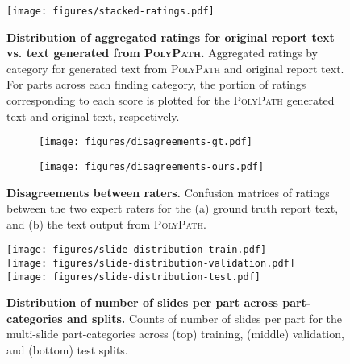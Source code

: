 \documentclass[11pt]{article}
\newcommand{\ourmodel}{\textsc{PolyPath}\xspace}
\begin{document}
\begin{figure}
    \centering
    \texttt{[image: figures/stacked-ratings.pdf]}
    \caption{\small \textbf{Distribution of aggregated ratings for original report text vs. text generated from \ourmodel.} Aggregated ratings by category for generated text from \ourmodel and original report text. For parts across each finding category, the portion of ratings corresponding to each score is plotted for the \ourmodel generated text and original text, respectively.}
    \label{fig:stackedratings}
\end{figure}


\begin{figure}[h]
\centering
  \begin{subfigure}[b]{0.45\textwidth}
    \centering
    \texttt{[image: figures/disagreements-gt.pdf]}
    \caption{}
    \label{fig:disagreementsgt}
  \end{subfigure}
  \quad
  \begin{subfigure}[b]{0.45\textwidth}
  \centering
  \texttt{[image: figures/disagreements-ours.pdf]}
  \caption{}
  \label{fig:disagreementsours}
  \end{subfigure}
\caption{\small \textbf{Disagreements between raters.} Confusion matrices of ratings between the two expert raters for the (a) ground truth report text, and (b) the text output from \ourmodel.}
\label{fig:disagreements}
\end{figure}


\begin{figure}[h]
\centering
\texttt{[image: figures/slide-distribution-train.pdf]} \\
\texttt{[image: figures/slide-distribution-validation.pdf]} \\
\texttt{[image: figures/slide-distribution-test.pdf]}
\caption{\small \textbf{Distribution of number of slides per part across part-categories and splits.} Counts of number of slides per part for the multi-slide part-categories across (top) training, (middle) validation, and (bottom) test splits.}
\label{fig:slidedistribution}
\end{figure}
\end{document}
